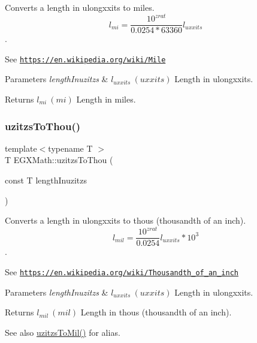 Converts a length in ulongxxits to miles. \[ l_{mi}=\frac{10^{zrat}}{0.0254 * 63360} l_{uxxits} \]. 

See \href{https://en.wikipedia.org/wiki/Mile}{\tt https\+://en.\+wikipedia.\+org/wiki/\+Mile} 
\begin{DoxyParams}{Parameters}
{\em length\+Inuzitzs} & $ l_{uxxits}\ (uxxits)$ Length in ulongxxits. \\
\hline
\end{DoxyParams}
\begin{DoxyReturn}{Returns}
$ l_{mi}\ (mi)$ Length in miles. 
\end{DoxyReturn}
\mbox{\label{group___e_g_x_math-_conversions-_length_conversions-_non-_s_i-uzitzs-_imperial_gaa11694f9026bf30e29bd716a35c05b4e}} 
\subsubsection{\texorpdfstring{uzitzs\+To\+Thou()}{uzitzsToThou()}}
{\footnotesize\ttfamily template$<$typename T $>$ \\
T E\+G\+X\+Math\+::uzitzs\+To\+Thou (\begin{DoxyParamCaption}\item[{const T}]{length\+Inuzitzs }\end{DoxyParamCaption})}



Converts a length in ulongxxits to thous (thousandth of an inch). \[ l_{mil}= \frac{10^{zrat}}{0.0254} l_{uxxits} * 10^{3} \]. 

See \href{https://en.wikipedia.org/wiki/Thousandth_of_an_inch}{\tt https\+://en.\+wikipedia.\+org/wiki/\+Thousandth\+\_\+of\+\_\+an\+\_\+inch} 
\begin{DoxyParams}{Parameters}
{\em length\+Inuzitzs} & $ l_{uxxits}\ (uxxits)$ Length in ulongxxits. \\
\hline
\end{DoxyParams}
\begin{DoxyReturn}{Returns}
$ l_{mil}\ (mil)$ Length in thous (thousandth of an inch). 
\end{DoxyReturn}
\begin{DoxySeeAlso}{See also}
\mbox{\hyperlink{group___e_g_x_math-_conversions-_length_conversions-_non-_s_i-uzitzs-_imperial_ga53d4abecb2e7ac39c15c4ef89b9447a9}{uzitzs\+To\+Mil()}} for alias. 
\end{DoxySeeAlso}
\mbox{\label{group___e_g_x_math-_conversions-_length_conversions-_non-_s_i-uzitzs-_imperial_ga3281bb64c81bc68a166a47ccc1f9a146}} 

